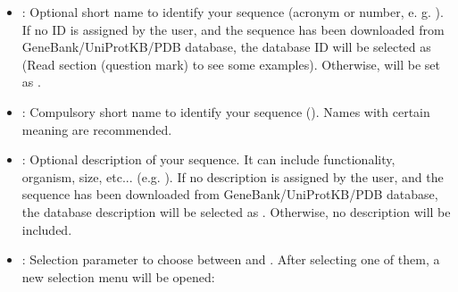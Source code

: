\begin{itemize}
  \begin{itemize}
  \item {}: Optional short name to identify your sequence (acronym or number, e. g. ). If no ID is assigned by the user, and the sequence has been downloaded from GeneBank/UniProtKB/PDB database, the database ID will be selected as  (Read  section (question mark) to see some examples). Otherwise,  will be set as .
  \item {}: Compulsory short name to identify your sequence (). Names with certain meaning are recommended.
  \item {}: Optional description of your sequence. It can include functionality, organism, size, etc... (e.g. ). If no description is assigned by the user, and the sequence has been downloaded from GeneBank/UniProtKB/PDB database, the database description will be selected as . Otherwise, no description will be included.
  \item {}: Selection parameter to choose between  and . After selecting one of them, a new selection menu will be opened:
  

\end{itemize}
\end{itemize}
